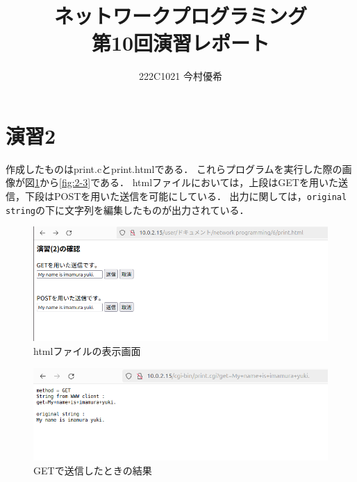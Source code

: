 \documentclass[documentclass]{jsarticle}
\begin{document}
\title{ネットワークプログラミング\\ 第10回演習レポート}
\author{222C1021 今村優希}
\maketitle

\newpage

\section*{演習2}
作成したものはprint.cとprint.htmlである．
これらプログラムを実行した際の画像が図\ref*{fig:2-1}から\ref*{fig:2-3}である．
htmlファイルにおいては，上段はGETを用いた送信，下段はPOSTを用いた送信を可能にしている．
出力に関しては，\texttt{original string}の下に文字列を編集したものが出力されている．




\begin{figure}[H]
  \begin{center}
    \includegraphics*[scale=0.8]{figure/2-0.png}
  \end{center}
  \caption[]{htmlファイルの表示画面}
  \label{fig:2-1}
\end{figure}

\begin{figure}[H]
  \begin{center}
    \includegraphics*[scale=0.8]{figure/2-1.png}
  \end{center}
  \caption[]{GETで送信したときの結果}
  \label{fig:2-2}
\end{figure}
\end{document}
